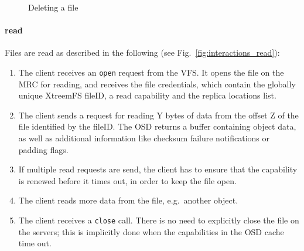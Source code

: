 \begin{figure}[h!]
\centering
{}
\caption{Deleting a file}
\label{fig:interactions_delete}
\end{figure}

\paragraph{read}

Files are read as described in the following (see Fig.\ \ref{fig:interactions_read}):

\begin{enumerate}
 \item The client receives an \texttt{open} request from the VFS. It opens the file on the MRC for reading, and receives the file credentials, which contain the globally unique XtreemFS fileID, a read capability and the replica locations list.
 \item The client sends a request for reading Y bytes of data from the offset Z of the file identified by the fileID. The OSD returns a buffer containing object data, as well as additional information like checksum failure notifications or padding flags.
 \item If multiple read requests are send, the client has to ensure that the capability is renewed before it times out, in order to keep the file open.
 \item The client reads more data from the file, e.g.\ another object.
 \item The client receives a \texttt{close} call. There is no need to explicitly close the file on the servers; this is implicitly done when the capabilities in the OSD cache time out.
\end{enumerate}

